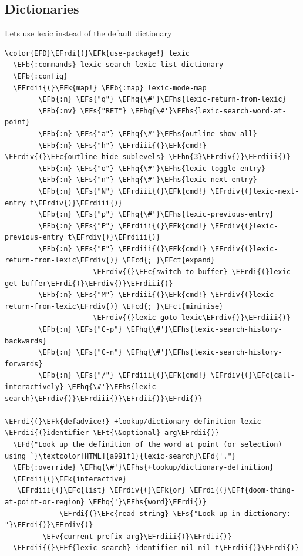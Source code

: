 \documentclass{scrartcl}
\newcommand{\EFk}[1]{\textcolor{EFk}{#1}} %
\newcommand{\EFd}[1]{\textcolor{EFd}{#1}} %
\newcommand{\EFt}[1]{\textcolor{EFt}{#1}} %
\newcommand{\EFs}[1]{\textcolor{EFs}{#1}} %
\newcommand{\EFb}[1]{\textcolor{EFb}{#1}} %
\newcommand{\EFct}[1]{\textcolor{EFct}{#1}} %
\newcommand{\EFc}[1]{\textcolor{EFc}{#1}} %
\newcommand{\EFv}[1]{\textcolor{EFv}{#1}} %
\newcommand{\EFf}[1]{\textcolor{EFf}{#1}} %
\newcommand{\EFcd}[1]{\textcolor{EFcd}{#1}} %
\newcommand{\EFhn}[1]{#1} %
\newcommand{\EFhq}[1]{#1} %
\newcommand{\EFhs}[1]{#1} %
\newcommand{\EFrdi}[1]{#1} %
\newcommand{\EFrdii}[1]{#1} %
\newcommand{\EFrdiii}[1]{#1} %
\newcommand{\EFrdiv}[1]{#1} %
\begin{document}
\subsection{Dictionaries}
\label{sec:org124bd71}
Lets use lexic instead of the default dictionary
\begin{Code}
\begin{Verbatim}[]
\color{EFD}\EFrdi{(}\EFk{use-package!} lexic
  \EFb{:commands} lexic-search lexic-list-dictionary
  \EFb{:config}
  \EFrdii{(}\EFk{map!} \EFb{:map} lexic-mode-map
        \EFb{:n} \EFs{"q"} \EFhq{\#'}\EFhs{lexic-return-from-lexic}
        \EFb{:nv} \EFs{"RET"} \EFhq{\#'}\EFhs{lexic-search-word-at-point}
        \EFb{:n} \EFs{"a"} \EFhq{\#'}\EFhs{outline-show-all}
        \EFb{:n} \EFs{"h"} \EFrdiii{(}\EFk{cmd!} \EFrdiv{(}\EFc{outline-hide-sublevels} \EFhn{3}\EFrdiv{)}\EFrdiii{)}
        \EFb{:n} \EFs{"o"} \EFhq{\#'}\EFhs{lexic-toggle-entry}
        \EFb{:n} \EFs{"n"} \EFhq{\#'}\EFhs{lexic-next-entry}
        \EFb{:n} \EFs{"N"} \EFrdiii{(}\EFk{cmd!} \EFrdiv{(}lexic-next-entry t\EFrdiv{)}\EFrdiii{)}
        \EFb{:n} \EFs{"p"} \EFhq{\#'}\EFhs{lexic-previous-entry}
        \EFb{:n} \EFs{"P"} \EFrdiii{(}\EFk{cmd!} \EFrdiv{(}lexic-previous-entry t\EFrdiv{)}\EFrdiii{)}
        \EFb{:n} \EFs{"E"} \EFrdiii{(}\EFk{cmd!} \EFrdiv{(}lexic-return-from-lexic\EFrdiv{)} \EFcd{; }\EFct{expand}
                     \EFrdiv{(}\EFc{switch-to-buffer} \EFrdi{(}lexic-get-buffer\EFrdi{)}\EFrdiv{)}\EFrdiii{)}
        \EFb{:n} \EFs{"M"} \EFrdiii{(}\EFk{cmd!} \EFrdiv{(}lexic-return-from-lexic\EFrdiv{)} \EFcd{; }\EFct{minimise}
                     \EFrdiv{(}lexic-goto-lexic\EFrdiv{)}\EFrdiii{)}
        \EFb{:n} \EFs{"C-p"} \EFhq{\#'}\EFhs{lexic-search-history-backwards}
        \EFb{:n} \EFs{"C-n"} \EFhq{\#'}\EFhs{lexic-search-history-forwards}
        \EFb{:n} \EFs{"/"} \EFrdiii{(}\EFk{cmd!} \EFrdiv{(}\EFc{call-interactively} \EFhq{\#'}\EFhs{lexic-search}\EFrdiv{)}\EFrdiii{)}\EFrdii{)}\EFrdi{)}

\EFrdi{(}\EFk{defadvice!} +lookup/dictionary-definition-lexic \EFrdii{(}identifier \EFt{\&optional} arg\EFrdii{)}
  \EFd{"Look up the definition of the word at point (or selection) using `}\textcolor[HTML]{a991f1}{lexic-search}\EFd{'."}
  \EFb{:override} \EFhq{\#'}\EFhs{+lookup/dictionary-definition}
  \EFrdii{(}\EFk{interactive}
   \EFrdiii{(}\EFc{list} \EFrdiv{(}\EFk{or} \EFrdi{(}\EFf{doom-thing-at-point-or-region} \EFhq{'}\EFhs{word}\EFrdi{)}
             \EFrdi{(}\EFc{read-string} \EFs{"Look up in dictionary: "}\EFrdi{)}\EFrdiv{)}
         \EFv{current-prefix-arg}\EFrdiii{)}\EFrdii{)}
  \EFrdii{(}\EFf{lexic-search} identifier nil nil t\EFrdii{)}\EFrdi{)}
\end{Verbatim}
\end{Code}
\end{document}
